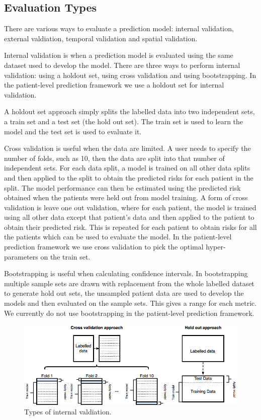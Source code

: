 \documentclass[11pt]{book}
\begin{document}
\subsection{Evaluation Types}\label{evaluation-types}

There are various ways to evaluate a prediction model: internal
validation, external valdiation, temporal validation and spatial
validation.

Internal validation is when a prediction model is evaluated using the
same dataset used to develop the model. There are three ways to perform
internal validation: using a holdout set, using cross validation and
using bootstrapping. In the patient-level prediction framework we use a
holdout set for internal validation.

A holdout set approach simply splits the labelled data into two
independent sets, a train set and a test set (the hold out set). The
train set is used to learn the model and the test set is used to
evaluate it.

Cross validation is useful when the data are limited. A user needs to
specify the number of folds, such as 10, then the data are split into
that number of independent sets. For each data split, a model is trained
on all other data splits and then applied to the split to obtain the
predicted risks for each patient in the split. The model performance can
then be estimated using the predicted risk obtained when the patients
were held out from model training. A form of cross validation is leave
one out validation, where for each patient, the model is trained using
all other data except that patient's data and then applied to the
patient to obtain their predicted risk. This is repeated for each
patient to obtain risks for all the patients which can be used to
evaluate the model. In the patient-level prediction framework we use
cross validation to pick the optimal hyper-parameters on the train set.

Bootstrapping is useful when calculating confidence intervals. In
bootstrapping multiple sample sets are drawn with replacement from the
whole labelled dataset to generate hold out sets, the unsampled patient
data are used to develop the models and then evaluated on the sample
sets. This gives a range for each metric. We currently do not use
bootstrapping in the patient-level prediction framework.

\begin{figure}
\includegraphics[width=1\linewidth]{images/PatientLevelPrediction/theory/validationTypes} \caption{Types of internal valdiation.}\label{fig:figuretheoryval}
\end{figure}
\end{document}
